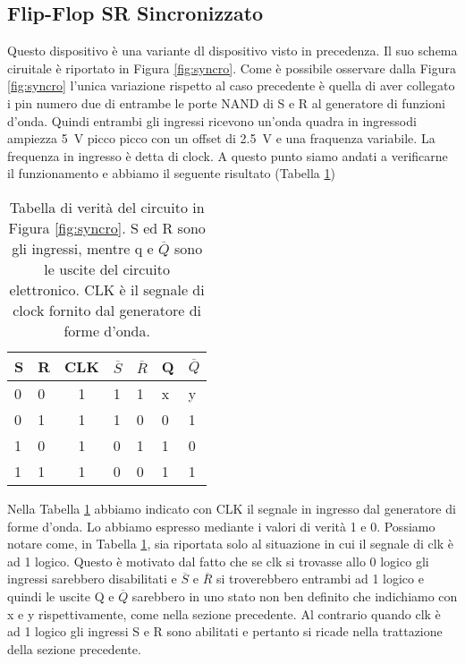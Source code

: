 \subsection*{Flip-Flop SR Sincronizzato}

Questo dispositivo è una variante dl dispositivo visto in precedenza. Il suo schema ciruitale è riportato in Figura \ref{fig:syncro}. Come è possibile osservare dalla Figura \ref{fig:syncro} l'unica variazione rispetto al caso precedente è quella di aver collegato i pin numero due di entrambe le porte NAND di S e R al generatore di funzioni d'onda. Quindi entrambi gli ingressi ricevono un'onda quadra in ingressodi ampiezza \SI{5}{\volt} picco picco con un offset di \SI{2.5}{\volt} e una fraquenza variabile. La frequenza in ingresso è detta di clock. A questo punto siamo andati a verificarne il funzionamento e abbiamo il seguente risultato (Tabella \ref{tab:syncro})

\begin{table}[h]
    \centering
    \begin{tabular}{llcll|ll}
	\toprule
		S & R & CLK & $\overline{S}$ & $\overline{R}$ & Q & $\overline{Q}$ \\
	\midrule
		0 & 0 & 1 & 1 & 1 & x & y \\
		0 & 1 & 1 & 1 & 0 & 0 & 1 \\
		1 & 0 & 1 & 0 & 1 & 1 & 0 \\
		1 & 1 & 1 & 0 & 0 & 1 & 1 \\
	\bottomrule
	\end{tabular}
    \caption{Tabella di verità del circuito in Figura \ref{fig:syncro}. S ed R sono gli ingressi, mentre q e $\overline{Q}$ sono le uscite del circuito elettronico. CLK è il segnale di clock fornito dal generatore di forme d'onda.}
    \label{tab:syncro}
\end{table}

Nella Tabella \ref{tab:syncro} abbiamo indicato con CLK il segnale in ingresso dal generatore di forme d'onda. Lo abbiamo espresso mediante i valori di verità 1 e 0. Possiamo notare come, in Tabella \ref{tab:syncro}, sia riportata solo al situazione in cui il segnale di clk è ad 1 logico. Questo è motivato dal fatto che se clk si trovasse allo 0 logico gli ingressi sarebbero disabilitati e $\overline{S}$ e $\overline{R}$ si troverebbero entrambi ad 1 logico e quindi le uscite Q e $\overline{Q}$ sarebbero in uno stato non ben definito che indichiamo con x e y rispettivamente, come nella sezione precedente. Al contrario quando clk è ad 1 logico gli ingressi S e R sono abilitati e pertanto si ricade nella trattazione della sezione precedente.

